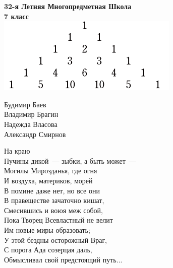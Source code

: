 \documentclass[10pt]{book}
\begin{document}
\begin{center}
	\Huge{\bf 32-я Летняя Многопредметная Школа}\\
	\Large{\bf 7 класс}\\ \vspace{.3cm}
	\includegraphics[width=\textwidth]{pasc}
	\begin{multicols}{2}
		Будимир Баев \\
		Владимир Брагин \\
		Надежда Власова \\
		Александр Смирнов \\
	\end{multicols}
\end{center}

\newpage

\begin{center}
На краю \\
Пучины дикой~--- зыбки, а быть может~--- \\
Могилы Мирозданья, где огня\\
И воздуха, материков, морей\\
В помине даже нет, но все они\\
В правеществе зачаточно кишат,\\
Смесившись и воюя меж собой,\\
Пока Творец Всевластный не велит\\
Им новые миры образовать;\\
У этой бездны осторожный Враг,\\
С порога Ада созерцая даль,\\
Обмысливал свой предстоящий путь...
\end{center}

\tableofcontents\newpage

\renewcommand{\@oddhead}{\vbox{\hbox to \textwidth{{\raisebox{1.8mm}{\strut{\small\bfseries Кировская ЛМШ 2016, 7 класс}}\hfil\raisebox{1.8mm}{\strut\bfseries\thepage}}}\hrule}}
\renewcommand{\@evenhead}{\vbox{\hbox to \textwidth{{\raisebox{1.8mm}{\strut\bfseries\thepage}\hfil\raisebox{1.8mm}{\strut{\small\bfseries Кировская ЛМШ 2016, 7 класс}}}}\hrule}}



\resetproblem
\vspace{1cm}
\newpage
{}

\resetproblem
\vspace{1cm}
\newpage
{}

\resetproblem
\vspace{1cm}
\newpage
\end{document}
